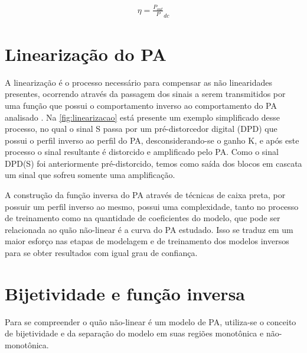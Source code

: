 \begin{align}
\eta = \frac{P_{out}}P_{dc}
\label{eq:resultado}
\end{align}

\section{Linearização do PA} \label{sec:fundteo-line}
A linearização é o processo necessário para compensar as não linearidades presentes, ocorrendo através da passagem dos sinais a serem transmitidos por uma função que possui o comportamento inverso ao comportamento do PA analisado \cite{kenington_high-linearity_2000}. Na \autoref{fig:linearizacao} está presente um exemplo simplificado desse processo, no qual o sinal S passa por um pré-distorcedor digital (DPD) que possui o perfil inverso ao perfil do PA, desconsiderando-se o ganho K, e após este processo o sinal resultante é distorcido e amplificado pelo PA. Como o sinal DPD(S) foi anteriormente pré-distorcido, temos como saída dos blocos em cascata um sinal que sofreu somente uma amplificação.


A construção da função inversa do PA através de técnicas de caixa preta, por possuir um perfil inverso ao mesmo, possui uma complexidade, tanto no processo de treinamento como na quantidade de coeficientes do modelo, que pode ser relacionada ao quão não-linear é a curva do PA estudado. Isso se traduz em um maior esforço nas etapas de modelagem e de treinamento dos modelos inversos para se obter resultados com igual grau de confiança.

\section{Bijetividade e função inversa} \label{sec:fundteo-bije}
Para se compreender o quão não-linear é um modelo de PA, utiliza-se o conceito de bijetividade e da separação do modelo em suas regiões monotônica e não-monotônica.

